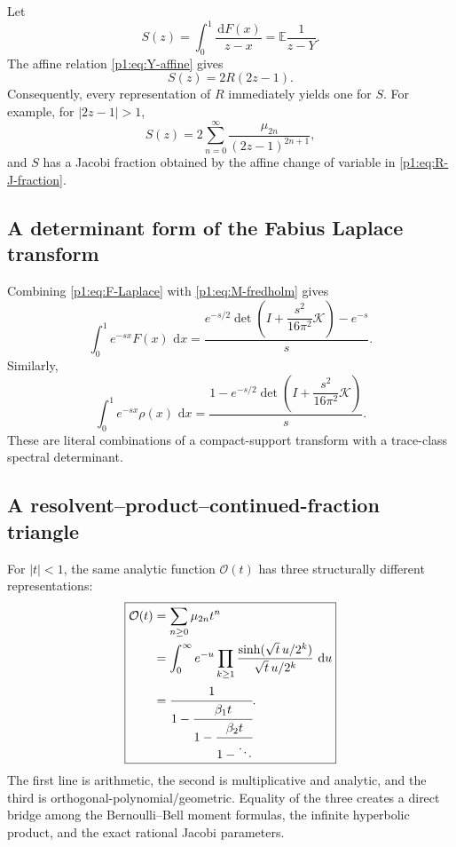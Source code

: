 \documentclass[11pt]{article}
\theoremstyle{definition}
\theoremstyle{remark}
\newcommand{\E}{\mathbb E}
\newcommand{\dd}{\,\mathrm d}
\newcommand{\cO}{\mathcal O}
\newcommand{\cK}{\mathcal K}
\begin{document}
Let
\begin{equation}
 S(z)=\int_0^1\frac{\dd F(x)}{z-x}=\E\frac1{z-Y}.            \label{p1:eq:S-def}
\end{equation}
The affine relation \eqref{p1:eq:Y-affine} gives
\begin{equation}
 \boxed{S(z)=2R(2z-1).}                                     \label{p1:eq:S-R}
\end{equation}
Consequently, every representation of \(R\) immediately yields one for \(S\).  For example,
for \(|2z-1|>1\),
\begin{equation}
 S(z)=2\sum_{n=0}^{\infty}\frac{\mu_{2n}}{(2z-1)^{2n+1}},   \label{p1:eq:S-moment}
\end{equation}
and \(S\) has a Jacobi fraction obtained by the affine change of variable in
\eqref{p1:eq:R-J-fraction}.

\subsection{A determinant form of the Fabius Laplace transform}

Combining \eqref{p1:eq:F-Laplace} with \eqref{p1:eq:M-fredholm} gives
\begin{equation}
 \int_0^1e^{-sx}F(x)\,\dd x
 =\frac{e^{-s/2}
 \det\!\left(I+\dfrac{s^2}{16\pi^2}\cK\right)-e^{-s}}{s}.  \label{p1:eq:F-Laplace-determinant}
\end{equation}
Similarly,
\begin{equation}
 \int_0^1e^{-sx}\rho(x)\,\dd x
 =\frac{1-e^{-s/2}
 \det\!\left(I+\dfrac{s^2}{16\pi^2}\cK\right)}{s}.         \label{p1:eq:rho-half-determinant}
\end{equation}
These are literal combinations of a compact-support transform with a trace-class spectral
determinant.

\subsection{A resolvent--product--continued-fraction triangle}

For \(|t|<1\), the same analytic function \(\cO(t)\) has three structurally different
representations:
\begin{equation}
 \boxed{
 \begin{aligned}
 \cO(t)
 &=\sum_{n\ge0}\mu_{2n}t^n\\
 &=\int_0^{\infty}e^{-u}
   \prod_{k\ge1}\frac{\sinh(\sqrt t\,u/2^k)}{\sqrt t\,u/2^k}\,\dd u\\
 &=\cfrac{1}{1-\cfrac{\beta_1t}{1-\cfrac{\beta_2t}{1-\ddots}}}.
 \end{aligned}
 }                                                           \label{p1:eq:triangle}
\end{equation}
The first line is arithmetic, the second is multiplicative and analytic, and the third is
orthogonal-polynomial/geometric.  Equality of the three creates a direct bridge among the
Bernoulli--Bell moment formulas, the infinite hyperbolic product, and the exact rational
Jacobi parameters.
\end{document}
